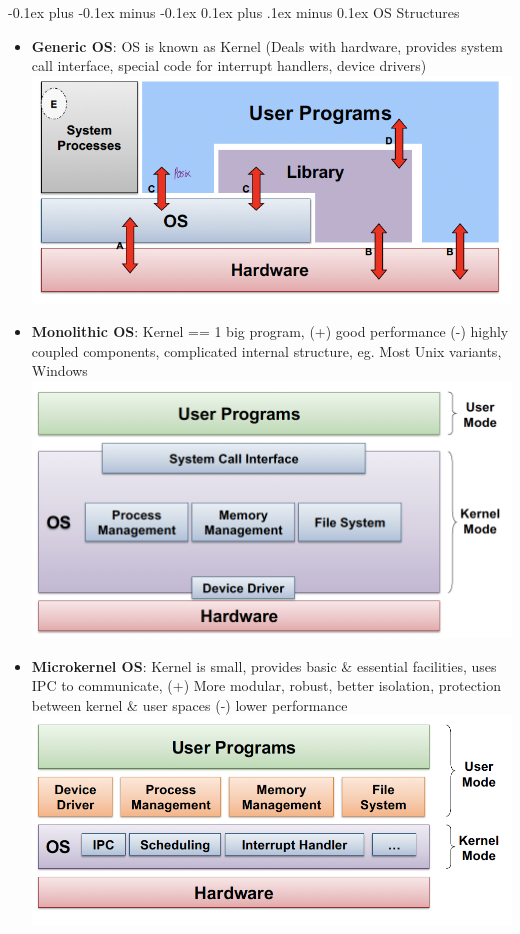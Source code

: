 \documentclass[landscape]{article}
\makeatletter
\renewcommand{\subsection}{\@startsection{subsection}{2}{0mm}%
  {-0.1ex plus -0.1ex minus -0.1ex}%
  {0.1ex plus .1ex minus 0.1ex}%
{\normalfont\scriptsize\bfseries}}
\makeatother
\begin{document}
\begin{multicols*}{5}
    \subsection{OS Structures}
    \begin{itemize}
      \item \textbf{Generic OS}: OS is known as Kernel (Deals with hardware, provides system call interface, special code for interrupt handlers, device drivers)
      \includegraphics[width=0.9\linewidth]{01_general_os.png}
      \item \textbf{Monolithic OS}: Kernel == 1 big program, (+) good performance (-) highly coupled components, complicated internal structure, eg. Most Unix variants, Windows
      \includegraphics[width=0.9\linewidth]{02_monolithic_os.png}
      \item \textbf{Microkernel OS}: Kernel is small, provides basic \& essential facilities, uses IPC to communicate, (+) More modular, robust, better isolation, protection between kernel \& user spaces (-) lower performance
      \includegraphics[width=0.9\linewidth]{03_microkernel_os.png}

\end{itemize}
\end{multicols*}
\end{document}
